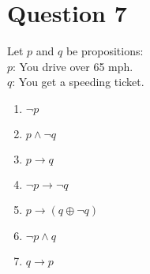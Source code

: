 \documentclass[12pt]{extarticle}
\begin{document}
\section*{Question 7}
	Let $p$ and $q$ be propositions:\\
		\hspace*{2cm}$p$: You drive over 65 mph.\\
		\hspace*{2cm}$q$: You get a speeding ticket.\\
	\begin{enumerate}
		\item $\neg p$
		\item $p \wedge \neg q$
		\item $p \to q$
		\item $\neg p \to \neg q$
		\item $p \to (q \oplus \neg q)$
		\item $\neg p \wedge q$
		\item $q \to p$
	\end{enumerate}
\end{document}
